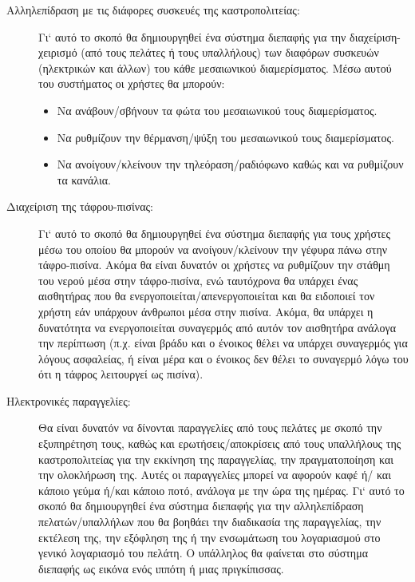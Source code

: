 \documentclass{assignment}
\begin{document}
\begin {description}

\item[Αλληλεπίδραση με τις διάφορες συσκευές της καστροπολιτείας:] Γι` αυτό το σκοπό θα δημιουργηθεί ένα σύστημα διεπαφής για την διαχείριση-χειρισμό (από τους πελάτες ή τους υπαλλήλους) των διαφόρων συσκευών (ηλεκτρικών και άλλων) του κάθε μεσαιωνικού διαμερίσματος. Μέσω αυτού του συστήματος οι χρήστες θα μπορούν:

  \begin{itemize}
  \item Να ανάβουν/σβήνουν τα φώτα του μεσαιωνικού τους διαμερίσματος.
  \item Να ρυθμίζουν την θέρμανση/ψύξη του μεσαιωνικού τους διαμερίσματος.
  \item Να ανοίγουν/κλείνουν την τηλεόραση/ραδιόφωνο καθώς και να ρυθμίζουν τα κανάλια.
  \end{itemize}

\item[Διαχείριση της τάφρου-πισίνας:] Γι` αυτό το σκοπό θα δημιουργηθεί ένα σύστημα διεπαφής για τους χρήστες μέσω του οποίου θα μπορούν να ανοίγουν/κλείνουν την γέφυρα πάνω στην τάφρο-πισίνα. Ακόμα θα είναι δυνατόν οι χρήστες να ρυθμίζουν την στάθμη του νερού μέσα στην τάφρο-πισίνα, ενώ ταυτόχρονα θα υπάρχει ένας αισθητήρας που θα ενεργοποιείται/απενεργοποιείται και θα ειδοποιεί τον χρήστη εάν υπάρχουν άνθρωποι μέσα στην πισίνα. Ακόμα, θα υπάρχει η δυνατότητα να ενεργοποιείται συναγερμός από αυτόν τον αισθητήρα ανάλογα την περίπτωση (π.χ. είναι βράδυ και ο ένοικος θέλει να υπάρχει συναγερμός για λόγους ασφαλείας, ή είναι μέρα και ο ένοικος δεν θέλει το συναγερμό λόγω του ότι η τάφρος λειτουργεί ως πισίνα).

\item[Ηλεκτρονικές παραγγελίες:] Θα είναι δυνατόν να δίνονται παραγγελίες από τους πελάτες με σκοπό την εξυπηρέτηση τους, καθώς και ερωτήσεις/αποκρίσεις από τους υπαλλήλους της καστροπολιτείας για την εκκίνηση της παραγγελίας, την πραγματοποίηση και την ολοκλήρωση της. Αυτές οι παραγγελίες μπορεί να αφορούν καφέ ή/ και κάποιο γεύμα ή/και κάποιο ποτό, ανάλογα με την ώρα της ημέρας. Γι` αυτό το σκοπό θα δημιουργηθεί ένα σύστημα διεπαφής για την αλληλεπίδραση πελατών/υπαλλήλων που θα βοηθάει την διαδικασία της παραγγελίας, την εκτέλεση της, την εξόφληση της ή την ενσωμάτωση του λογαριασμού στο γενικό λογαριασμό του πελάτη. Ο υπάλληλος θα φαίνεται στο σύστημα διεπαφής ως εικόνα ενός ιππότη ή μιας πριγκίπισσας. 

\end{description}
\end{document}
